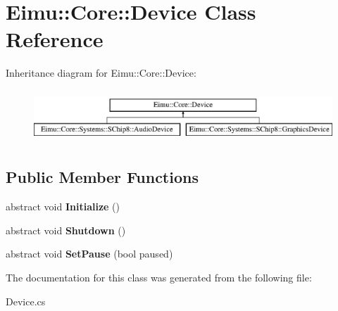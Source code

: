 \hypertarget{class_eimu_1_1_core_1_1_device}{
\section{Eimu::Core::Device Class Reference}
\label{class_eimu_1_1_core_1_1_device}
}
Inheritance diagram for Eimu::Core::Device:\begin{figure}[H]
\begin{center}
\leavevmode
\includegraphics[height=2.000000cm]{class_eimu_1_1_core_1_1_device}
\end{center}
\end{figure}
\subsection*{Public Member Functions}
\begin{DoxyCompactItemize}
\item 
\hypertarget{class_eimu_1_1_core_1_1_device_ae4922bc554b7c1683b571d3baeb3bf0e}{
abstract void {\bfseries Initialize} ()}
\label{class_eimu_1_1_core_1_1_device_ae4922bc554b7c1683b571d3baeb3bf0e}

\item 
\hypertarget{class_eimu_1_1_core_1_1_device_a91771728c330ee5233ef9cc50b403db5}{
abstract void {\bfseries Shutdown} ()}
\label{class_eimu_1_1_core_1_1_device_a91771728c330ee5233ef9cc50b403db5}

\item 
\hypertarget{class_eimu_1_1_core_1_1_device_a56b924c9e49b1c1b3bed742f69133547}{
abstract void {\bfseries SetPause} (bool paused)}
\label{class_eimu_1_1_core_1_1_device_a56b924c9e49b1c1b3bed742f69133547}

\end{DoxyCompactItemize}


The documentation for this class was generated from the following file:\begin{DoxyCompactItemize}
\item 
Device.cs\end{DoxyCompactItemize}
